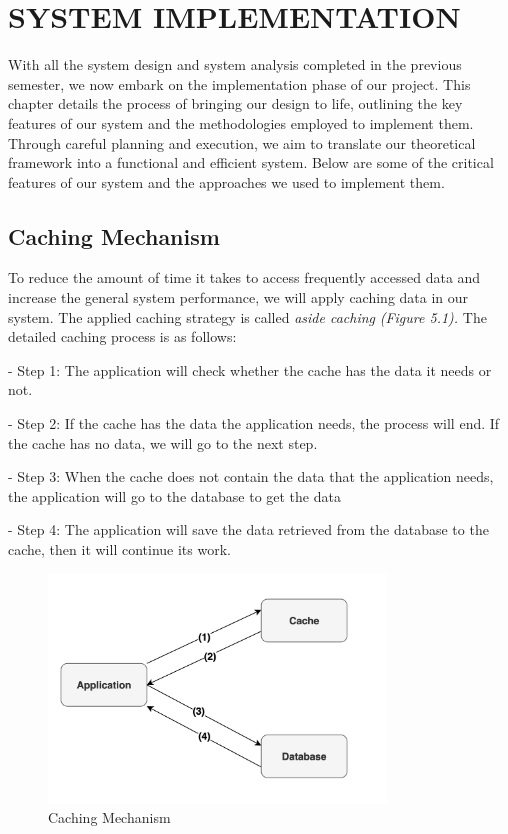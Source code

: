 \chapter{SYSTEM IMPLEMENTATION}

With all the system design and system analysis completed in the previous semester, we now embark on the implementation phase of our project. This chapter details the process of bringing our design to life, outlining the key features of our system and the methodologies employed to implement them. Through careful planning and execution, we aim to translate our theoretical framework into a functional and efficient system. Below are some of the critical features of our system and the approaches we used to implement them.

\section{Caching Mechanism}

To reduce the amount of time it takes to access frequently accessed data
and increase the general system performance, we will apply caching data
in our system. The applied caching strategy is called \emph{aside
    caching} \emph{(Figure 5.1).} The detailed caching process is as follows:

- Step 1: The application will check whether the cache has the data it
needs or not.

- Step 2: If the cache has the data the application needs, the process
will end. If the cache has no data, we will go to the next step.

- Step 3: When the cache does not contain the data that the application
needs, the application will go to the database to get the data

- Step 4: The application will save the data retrieved from the database
to the cache, then it will continue its work.

\begin{figure}[H]
    \centering
    \includegraphics[width=0.8\textwidth]{Figures/caching_strat.png}
    \caption{Caching Mechanism}
\end{figure}

